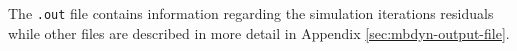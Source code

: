 The \texttt{.out} file contains information regarding the simulation iterations residuals while other files are described in more detail in Appendix \ref{sec:mbdyn-output-file}.



%
%
%



